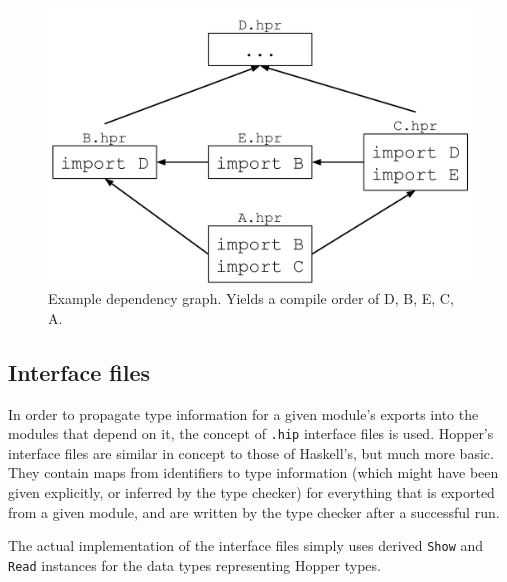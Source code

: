 \begin{figure}[h!]
\centering
  \includegraphics[width=0.6\pdfpagewidth]{figure/depgraph}
  \caption{Example dependency graph. Yields a compile order of D, B, E, C, A.}
  \label{fig:depgraph}
\end{figure}

\subsection{Interface files}
In order to propagate type information for a given module's exports into the modules that depend on it, the concept of \texttt{.hip} interface files is used. Hopper's interface files are similar in concept to those of Haskell's\cite{interfacefiles}, but much more basic. They contain maps from identifiers to type information (which might have been given explicitly, or inferred by the type checker) for everything that is exported from a given module, and are written by the type checker after a successful run.

The actual implementation of the interface files simply uses derived \texttt{Show} and \texttt{Read} instances for the data types representing Hopper types.
